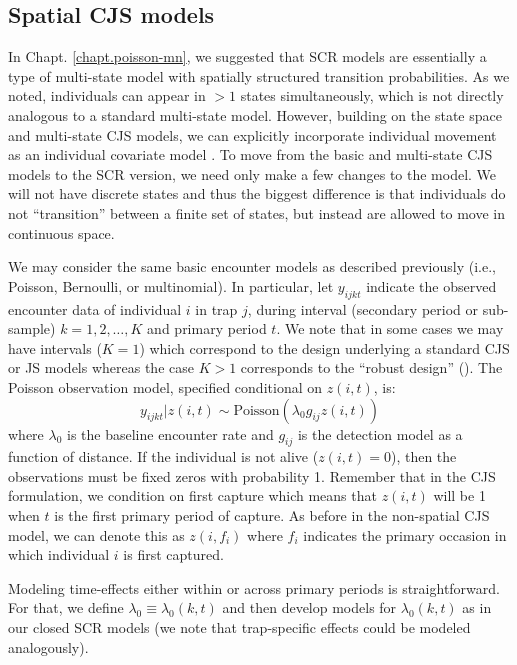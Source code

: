 \subsection{Spatial CJS models}

In Chapt. \ref{chapt.poisson-mn}, we suggested that SCR models are 
essentially a type of multi-state model with spatially structured
transition probabilities.  As we noted, individuals can appear in $>1$
states simultaneously, which is not directly analogous to a standard
multi-state model.  However, building on the state space and
multi-state CJS models, we can explicitly incorporate individual
movement as an individual covariate model \citep{royle_indcov:2007}.
To move from the basic and multi-state CJS models to the SCR version,
we need only make a few changes to the model.  We will
not have discrete states and thus the biggest difference is that
individuals do not ``transition'' between a finite set of states, but
instead are allowed to move in continuous space.

We may consider the same basic encounter
models as described previously (i.e., Poisson, Bernoulli, or
multinomial). In particular, let $y_{ijkt}$ indicate the observed
encounter data of individual $i$ in trap $j$, during interval
(secondary period or sub-sample) $k=1,2,\ldots,K$ and primary period $t$. We note that in
some cases we may have intervals ($K=1$) which correspond to the
design underlying a standard CJS or JS models whereas the case $K>1$
corresponds to the ``robust design'' (\citealt{pollock:1982}).  The
Poisson observation model, specified conditional on $z(i,t)$, is:
 \[
  y_{ijkt}|z(i,t) \sim  \mbox{Poisson}(\lambda_0 g_{ij} z(i,t))
\]
where $\lambda_{0}$ is the baseline encounter rate and $g_{ij}$ is the detection model as a function
of distance.
If the
individual is not alive ($z(i,t)=0$), then the observations must be
fixed zeros with probability 1.   Remember that in the CJS formulation, we  condition on first capture
which means that $z(i,t)$ will
be 1 when $t$ is the first primary period of capture.  As before in the non-spatial CJS model, we can denote this as $z(i, f_i)$
where $f_i$ indicates the primary occasion in which individual $i$ is first captured.

Modeling time-effects either
within or across primary periods
is straightforward. For that, we define $\lambda_{0} \equiv
\lambda_{0}(k,t)$ and then develop models for
$\lambda_{0}(k,t)$ as in our closed SCR models (we note that
trap-specific effects could be modeled analogously).

